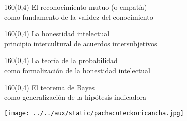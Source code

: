 \documentclass[shownotes,aspectratio=169]{beamer}
\begin{document}
\begin{frame}[plain]
\begin{textblock}{160}(0,4)
\centering \LARGE El reconocimiento mutuo (o empatía) \\ \Large como fundamento de la validez del conocimiento
\end{textblock}
\vspace{0.75cm}

 
\end{frame}

\begin{frame}[plain]
\begin{textblock}{160}(0,4)
\centering \LARGE La honestidad intelectual \\ \Large principio intercultural de acuerdos intersubjetivos
\end{textblock}
\vspace{0.75cm}


\end{frame}
 
 
\begin{frame}[plain]
\begin{textblock}{160}(0,4)
\centering \LARGE La teoría de la probabilidad \\ \Large como formalización de la honestidad intelectual
\end{textblock}
\vspace{0.75cm}


\end{frame}
 

\begin{frame}[plain]
\begin{textblock}{160}(0,4)
\centering \LARGE El teorema de Bayes \\ \Large como generalización de la hipótesis indicadora
\end{textblock}
\vspace{0.75cm}

  
\end{frame}

 
 
 
\begin{frame}[plain]
\centering
  \texttt{[image: ../../aux/static/pachacuteckoricancha.jpg]}
\end{frame}
\end{document}
